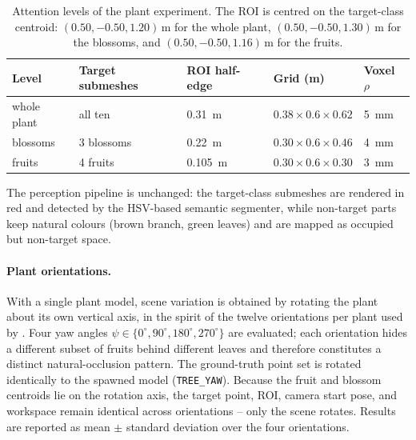 \begin{table}[h]
\centering
\begin{tabular}{lllll}
\toprule
Level & Target submeshes & ROI half-edge & Grid (m) & Voxel $\rho$ \\
\midrule
whole plant & all ten          & \SI{0.31}{\metre}  & $0.38 \times 0.6 \times 0.62$ & \SI{5}{\milli\metre} \\
blossoms    & 3 blossoms       & \SI{0.22}{\metre}  & $0.30 \times 0.6 \times 0.46$ & \SI{4}{\milli\metre} \\
fruits      & 4 fruits         & \SI{0.105}{\metre} & $0.30 \times 0.6 \times 0.30$ & \SI{3}{\milli\metre} \\
\bottomrule
\end{tabular}
\caption{Attention levels of the plant experiment. The ROI is centred on the
target-class centroid: $(0.50, -0.50, 1.20)$\,m for the whole plant,
$(0.50, -0.50, 1.30)$\,m for the blossoms, and $(0.50, -0.50, 1.16)$\,m for
the fruits.}
\label{tab:tree-levels}
\end{table}

The perception pipeline is unchanged: the target-class submeshes are rendered
in red and detected by the HSV-based semantic segmenter, while non-target
parts keep natural colours (brown branch, green leaves) and are mapped as
occupied but non-target space.\\

\paragraph{Plant orientations.} With a single plant model, scene variation is
obtained by rotating the plant about its own vertical axis, in the spirit of
the twelve orientations per plant used by \citet{burusa2024}. Four yaw
angles $\psi \in \{0^\circ, 90^\circ, 180^\circ, 270^\circ\}$ are evaluated;
each orientation hides a different subset of fruits behind different leaves
and therefore constitutes a distinct natural-occlusion pattern. The
ground-truth point set is rotated identically to the spawned model
(\texttt{TREE\_YAW}). Because the fruit and blossom centroids lie on the
rotation axis, the target point, ROI, camera start pose, and workspace remain
identical across orientations -- only the scene rotates. Results are reported
as mean $\pm$ standard deviation over the four orientations.\\

